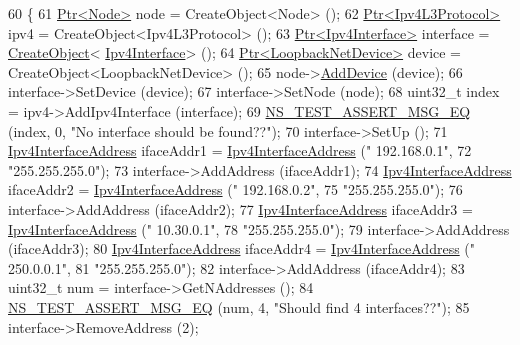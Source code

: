 \begin{DoxyCode}
60 \{
61   \hyperlink{classns3_1_1Ptr}{Ptr<Node>} node = CreateObject<Node> ();
62   \hyperlink{classns3_1_1Ptr}{Ptr<Ipv4L3Protocol>} ipv4 = CreateObject<Ipv4L3Protocol> ();
63   \hyperlink{classns3_1_1Ptr}{Ptr<Ipv4Interface>} \textcolor{keyword}{interface }= \hyperlink{group__object_gad1d36559be10afa72c3656fd8598c1e2}{CreateObject}<
      \hyperlink{classns3_1_1Ipv4Interface}{Ipv4Interface}> ();
64   \hyperlink{classns3_1_1Ptr}{Ptr<LoopbackNetDevice>} device = CreateObject<LoopbackNetDevice> ();
65   node->\hyperlink{classns3_1_1Node_a42ff83ee1d5d1649c770d3f5b62375de}{AddDevice} (device);
66   interface->SetDevice (device);
67   interface->SetNode (node);
68   uint32\_t index = ipv4->AddIpv4Interface (interface);
69   \hyperlink{group__testing_ga2a9d78cffb3db8e867c35fff0b698cf5}{NS\_TEST\_ASSERT\_MSG\_EQ} (index, 0, \textcolor{stringliteral}{"No interface should be found??"});
70   interface->SetUp ();
71   \hyperlink{classns3_1_1Ipv4InterfaceAddress}{Ipv4InterfaceAddress} ifaceAddr1 = \hyperlink{classns3_1_1Ipv4InterfaceAddress}{Ipv4InterfaceAddress} (\textcolor{stringliteral}{"
      192.168.0.1"},
72                                                           \textcolor{stringliteral}{"255.255.255.0"});
73   interface->AddAddress (ifaceAddr1);
74   \hyperlink{classns3_1_1Ipv4InterfaceAddress}{Ipv4InterfaceAddress} ifaceAddr2 = \hyperlink{classns3_1_1Ipv4InterfaceAddress}{Ipv4InterfaceAddress} (\textcolor{stringliteral}{"
      192.168.0.2"},
75                                                           \textcolor{stringliteral}{"255.255.255.0"});
76   interface->AddAddress (ifaceAddr2);
77   \hyperlink{classns3_1_1Ipv4InterfaceAddress}{Ipv4InterfaceAddress} ifaceAddr3 = \hyperlink{classns3_1_1Ipv4InterfaceAddress}{Ipv4InterfaceAddress} (\textcolor{stringliteral}{"
      10.30.0.1"},
78                                                           \textcolor{stringliteral}{"255.255.255.0"});
79   interface->AddAddress (ifaceAddr3);
80   \hyperlink{classns3_1_1Ipv4InterfaceAddress}{Ipv4InterfaceAddress} ifaceAddr4 = \hyperlink{classns3_1_1Ipv4InterfaceAddress}{Ipv4InterfaceAddress} (\textcolor{stringliteral}{"
      250.0.0.1"},
81                                                           \textcolor{stringliteral}{"255.255.255.0"});
82   interface->AddAddress (ifaceAddr4);
83   uint32\_t num = interface->GetNAddresses ();
84   \hyperlink{group__testing_ga2a9d78cffb3db8e867c35fff0b698cf5}{NS\_TEST\_ASSERT\_MSG\_EQ} (num, 4, \textcolor{stringliteral}{"Should find 4 interfaces??"});
85   interface->RemoveAddress (2);

\end{DoxyCode}
